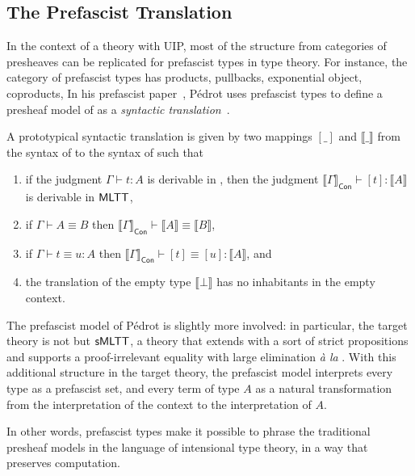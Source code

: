 \subsection{The Prefascist Translation}

In the context of a theory with UIP, most of the structure from categories of
presheaves can be replicated for prefascist types in type theory. For instance,
the category of prefascist types has products, pullbacks, exponential object,
coproducts, \etc
% 
In his prefascist paper~, Pédrot uses prefascist 
types to define a presheaf model of \MLTT as a \emph{syntactic 
translation}~.

A prototypical syntactic translation is given by two mappings \( [\_] \) and
\( \llbracket \_ \rrbracket \) from the syntax of \MLTT to the syntax of 
\MLTT such that
% 
\begin{enumerate}
\item if the judgment \( \Gamma \vdash t : A \) is derivable in \MLTT, then 
the judgment
\( {\llbracket \Gamma \rrbracket_{\mathsf{Con}} \vdash [t] : \llbracket A \rrbracket} \)
is derivable in \( \mathsf{MLTT} \), 
\item if \( \Gamma \vdash A \equiv B \) then
\( {\llbracket \Gamma \rrbracket_{\mathsf{Con}} \vdash \llbracket A \rrbracket \equiv \llbracket B \rrbracket} \),
\item if \( \Gamma \vdash t \equiv u : A \) then
\( {\llbracket \Gamma \rrbracket_{\mathsf{Con}} \vdash [t] \equiv [u] : \llbracket A \rrbracket} \), and
\item the translation of the empty type \( \llbracket \bot \rrbracket \) has no 
inhabitants in the empty context.
\end{enumerate}
% 

The prefascist model of Pédrot is slightly more involved: in particular, the target theory
is not \MLTT but \( \mathsf{sMLTT} \), a theory that extends \MLTT with a sort of 
strict propositions and supports a proof-irrelevant equality with large
elimination \emph{à la} \Lean.
% 
With this additional structure in the target theory, the prefascist model
interprets every type as a prefascist set, and every term of type \( A \) as a 
natural transformation from the interpretation of the context to the 
interpretation of \( A \).

In other words, prefascist types make it possible to phrase the traditional
presheaf models in the language of intensional type theory, in a way that 
preserves computation.

